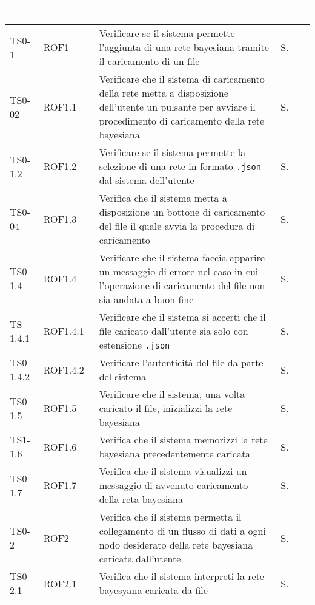 \begin{longtable}{|C{.15\textwidth}|C{.14\textwidth}|m{.52\textwidth}|m{.08\textwidth}|}
\hline
{}\textbf{\textcolor{white}{Test}} & \textbf{\textcolor{white}{Requisito}} & \textbf{\textcolor{white}{Descrizione}} & \textbf{\textcolor{white}{Esito}}\\
\hline \hline
\endhead

TS0-1 & ROF1 & Verificare se il sistema permette l'aggiunta di una rete bayesiana tramite il caricamento di un file & S. \\
\hline
{} TS0-02 & ROF1.1 & Verificare che il sistema di caricamento della rete metta a disposizione dell'utente un pulsante per avviare il procedimento di caricamento della rete bayesiana & S.\\
\hline
TS0-1.2 & ROF1.2 & Verificare se il sistema permette la selezione di una rete in formato \texttt{.json} dal sistema dell'utente & S. \\
 TS0-04 & ROF1.3 & Verifica che il sistema metta a disposizione un bottone di caricamento del file il quale avvia la procedura di caricamento & S. \\
\hline
TS0-1.4 &  ROF1.4 & Verificare che il sistema faccia apparire un messaggio di errore nel caso in cui l'operazione di caricamento del file non sia andata a buon fine & S. \\
\hline
{} TS-1.4.1 & ROF1.4.1 & Verificare che il sistema si accerti che il file caricato dall'utente sia solo con estensione \texttt{.json} & S. \\
\hline
TS0-1.4.2 & ROF1.4.2 & Verificare l'autenticità del file da parte del sistema & S. \\
\hline 
{} TS0-1.5  & ROF1.5 & Verificare che il sistema, una volta caricato il file, inizializzi la rete bayesiana & S. \\
\hline 
TS1-1.6 & ROF1.6 & Verifica che il sistema memorizzi la rete bayesiana precedentemente caricata & S. \\
\hline
{} TS0-1.7 & ROF1.7 & Verifica che il sistema visualizzi un messaggio di avvenuto caricamento della reta bayesiana & S. \\
\hline
TS0-2 & ROF2 & Verifica che il sistema permetta il collegamento di un flusso di dati a ogni nodo desiderato della rete bayesiana caricata dall'utente & S. \\
\hline
{} TS0-2.1 & ROF2.1 & Verifica che il sistema interpreti la rete bayesyana caricata da file & S. \\

\end{longtable}
